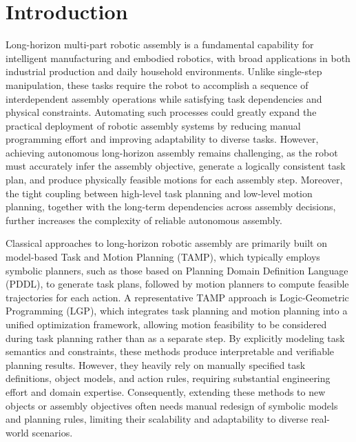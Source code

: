 \documentclass[journal]{IEEEtran}
\begin{document}
\section{Introduction}

Long-horizon multi-part robotic assembly is a fundamental capability for intelligent manufacturing and embodied robotics, with broad applications in both industrial production and daily household environments. 
Unlike single-step manipulation, these tasks require the robot to accomplish a sequence of interdependent assembly operations while satisfying task dependencies and physical constraints. 
Automating such processes could greatly expand the practical deployment of robotic assembly systems by reducing manual programming effort and improving adaptability to diverse tasks. 
However, achieving autonomous long-horizon assembly remains challenging, as the robot must accurately infer the assembly objective, generate a logically consistent task plan, and produce physically feasible motions for each assembly step. 
Moreover, the tight coupling between high-level task planning and low-level motion planning, together with the long-term dependencies across assembly decisions, further increases the complexity of reliable autonomous assembly.

Classical approaches to long-horizon robotic assembly are primarily built on model-based Task and Motion Planning (TAMP), which typically employs symbolic planners, such as those based on Planning Domain Definition Language (PDDL), to generate task plans, followed by motion planners to compute feasible trajectories for each action.
A representative TAMP approach is Logic-Geometric Programming (LGP), which integrates task planning and motion planning into a unified optimization framework, allowing motion feasibility to be considered during task planning rather than as a separate step.
By explicitly modeling task semantics and constraints, these methods produce interpretable and verifiable planning results. 
However, they heavily rely on manually specified task definitions, object models, and action rules, requiring substantial engineering effort and domain expertise. 
Consequently, extending these methods to new objects or assembly objectives often needs manual redesign of symbolic models and planning rules, limiting their scalability and adaptability to diverse real-world scenarios.
\end{document}
